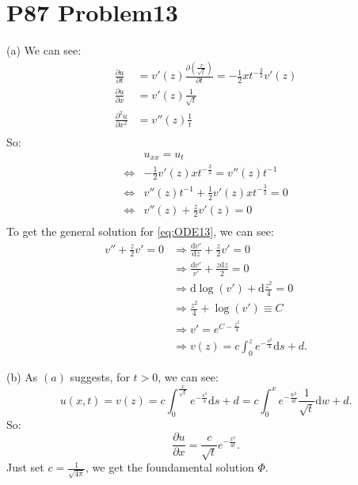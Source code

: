 \documentclass[a4paper]{ctexart}
\newcommand{\dif}{\mathrm{d}}
\newcommand{\difFrac}[2]{\frac{\dif #1}{\dif #2}}
\newcommand{\pdfFrac}[2]{\frac{\partial #1}{\partial #2}}
\begin{document}
\section*{P87 Problem13}
(a) We can see:
\begin{equation}
    \begin{aligned}
    \pdfFrac{u}{t}&=v'(z)\pdfFrac{(\frac{x}{\sqrt{t}})}{t}=-\frac{1}{2}xt^{-\frac{3}{2}}v'(z)\\
    \pdfFrac{u}{x}&=v'(z)\frac{1}{\sqrt{t}}\\
    \pdfFrac{^{2}u}{x^{2}}&=v''(z)\frac{1}{t}\\
    \end{aligned}
\end{equation}
So:
\begin{equation}
    \label{eq:ODE13}
    \begin{aligned}
        &u_{xx}=u_{t}\\
        \Leftrightarrow &-\frac{1}{2}v'(z)xt^{-\frac{3}{2}}=v''(z)t^{-1}\\
        \Leftrightarrow &v''(z)t^{-1}+\frac{1}{2}v'(z)xt^{-\frac{3}{2}}=0\\
        \Leftrightarrow &v''(z)+\frac{z}{2}v'(z)=0\\
    \end{aligned}
\end{equation}
To get the general solution for \ref{eq:ODE13}, we can see:
\begin{equation}
    \begin{aligned}
        v''+\frac{z}{2}v'=0&\Rightarrow \difFrac{v'}{z}+\frac{z}{2}v'=0\\
        &\Rightarrow \frac{\dif v'}{v'}+\frac{z\dif z}{2}=0\\
        &\Rightarrow \dif \log(v')+\dif\frac{z^{2}}{4}=0\\
        &\Rightarrow \frac{z^{2}}{4}+\log(v')\equiv C\\
        &\Rightarrow v'=e^{C-\frac{z^{2}}{4}}\\
        &\Rightarrow v(z)=c\int_{0}^{z}e^{-\frac{s^{2}}{4}}\dif s+d.
    \end{aligned}
\end{equation}

(b)
As $(a)$ suggests, for $t>0$, we can see:
\begin{equation}
    u(x,t)=v(z)=c\int_{0}^{\frac{x}{\sqrt{t}}}e^{-\frac{s^{2}}{4}}\dif s+d=c\int_{0}^{x}e^{-\frac{w^{2}}{4t}}\frac{1}{\sqrt{t}}\dif w+d.
\end{equation}
So:
\begin{equation}
    \pdfFrac{u}{x}=\frac{c}{\sqrt{t}}e^{-\frac{x^{2}}{4t}}.
\end{equation}
Just set $c=\frac{1}{\sqrt{4\pi}}$, we get the foundamental solution $\Phi$.
\end{document}
